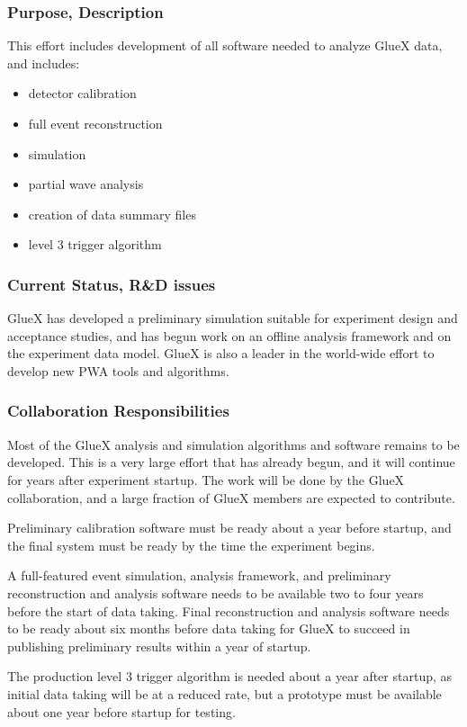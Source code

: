 \subsubsection*{Purpose, Description}

This effort includes development of all software needed to analyze GlueX
data, and includes:
\begin{itemize}
\item detector calibration 
\item full event reconstruction
\item simulation
\item partial wave analysis
\item creation of data summary files
\item level 3 trigger algorithm
\end{itemize}


\subsubsection*{Current Status, R\&D issues}

GlueX has developed a preliminary simulation suitable for experiment design
and acceptance studies, and has begun work on an offline analysis
framework and on the experiment data model.  GlueX is also a leader in
the world-wide effort to develop new PWA tools and algorithms.  


\subsubsection*{Collaboration Responsibilities}

Most of the GlueX analysis and simulation algorithms and software
remains to be developed.  This is a very large effort that has already
begun, and it will continue for years after experiment startup.  The
work will be done by the GlueX collaboration, and a large fraction of
GlueX members are expected to contribute.

Preliminary calibration software must be ready about a year before
startup, and the final system must be ready by the time the experiment
begins.

A full-featured event simulation, analysis framework, and preliminary
reconstruction and analysis software needs to be available two to four
years before the start of data taking.  Final reconstruction and
analysis software needs to be ready about six months before data
taking for GlueX to succeed in publishing preliminary results within a
year of startup.

The production level 3 trigger algorithm is needed about a year after
startup, as initial data taking will be at a reduced rate, but a
prototype must be available about one year before startup for testing.

